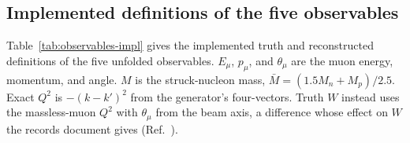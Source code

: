 \subsection{Implemented definitions of the five observables}
\label{sec:eavailw-definitions}

\providecommand{\pcell}[2]{\parbox[t]{#1}{\raggedright\strut#2\strut}}
Table~\ref{tab:observables-impl} gives the implemented truth and reconstructed definitions of the five unfolded observables. $E_{\mu}$, $p_{\mu}$, and $\theta_{\mu}$ are the muon energy, momentum, and angle. $M$ is the struck-nucleon mass, $\bar M=(1.5M_{n}+M_{p})/2.5$. Exact $Q^{2}$ is $-(k-k')^{2}$ from the generator's four-vectors. Truth $W$ instead uses the massless-muon $Q^{2}$ with $\theta_{\mu}$ from the beam axis, a difference whose effect on $W$ the records document gives (Ref.~\cite{NoteRecords2026}).

